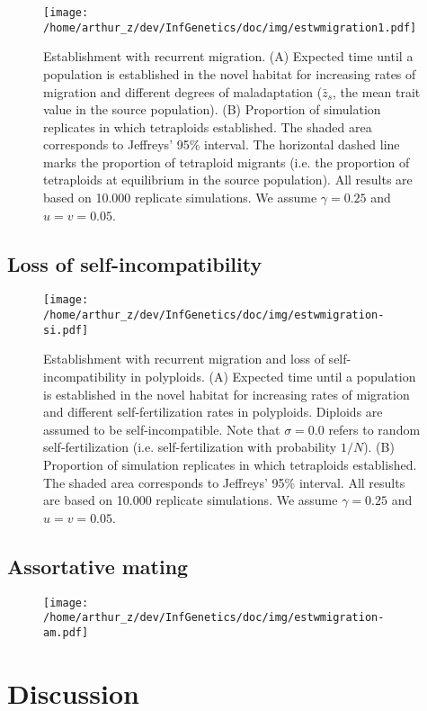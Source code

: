 \documentclass[11pt,a4paper]{article}
\begin{document}
\begin{figure}[t]
\centering
\texttt{[image: /home/arthur\_z/dev/InfGenetics/doc/img/estwmigration1.pdf]}
\caption{
Establishment with recurrent migration.
(A) Expected time until a population is established in the novel habitat for
increasing rates of migration and different degrees of maladaptation
($\bar{z}_s$, the mean trait value in the source population). 
(B) Proportion of simulation replicates in which tetraploids established. 
The shaded area corresponds to Jeffreys' 95\% interval.
The horizontal dashed line marks the proportion of tetraploid migrants (i.e.
the proportion of tetraploids at equilibrium in the source population).
All results are based on 10.000 replicate simulations.
We assume $\gamma=0.25$ and $u=v=0.05$.
\label{fig:estwmig}}
\end{figure}

\subsection*{Loss of self-incompatibility}


\begin{figure}
\centering
\texttt{[image: /home/arthur\_z/dev/InfGenetics/doc/img/estwmigration-si.pdf]}
\caption{
Establishment with recurrent migration and loss of self-incompatibility in
polyploids.
(A) Expected time until a population is established in the novel habitat for
increasing rates of migration and different self-fertilization rates in
polyploids. Diploids are assumed to be self-incompatible.
Note that $\sigma=0.0$ refers to random self-fertilization (i.e.
self-fertilization with probability $1/N$). 
(B) Proportion of simulation replicates in which tetraploids established. 
The shaded area corresponds to Jeffreys' 95\% interval.
All results are based on 10.000 replicate simulations.
We assume $\gamma=0.25$ and $u=v=0.05$.
\label{fig:}}
\end{figure}


\subsection*{Assortative mating}

\begin{figure}
\texttt{[image: /home/arthur\_z/dev/InfGenetics/doc/img/estwmigration-am.pdf]}
\caption{
\label{fig:}}
\end{figure}

\section*{Discussion}




\end{document}
